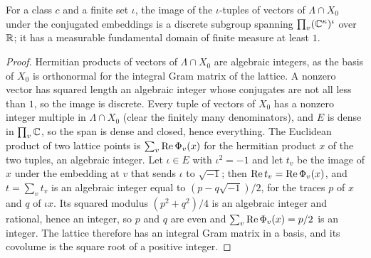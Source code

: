 \begin{lemma}\label{lem:column-lattice}
For a class $c$ and a finite set $\iota$, the image of the $\iota$-tuples of vectors of $\Lambda\cap X_0$ under the conjugated embeddings is a discrete subgroup spanning $\prod_v(\mathbb{C}^\kappa)^\iota$ over $\mathbb{R}$; it has a
measurable fundamental domain of finite measure at least $1$.
\end{lemma}

\begin{proof}
Hermitian products of vectors of $\Lambda\cap X_0$ are algebraic integers, as the basis of $X_0$ is orthonormal for the integral Gram matrix of the lattice. A nonzero vector has squared length an algebraic integer
whose conjugates are not all less than $1$, so the image is discrete. Every tuple of vectors of $X_0$ has a nonzero integer multiple in $\Lambda\cap X_0$ (clear the finitely many denominators), and $E$ is dense in
$\prod_v\mathbb{C}$, so the span is dense and closed, hence everything. The Euclidean product of two lattice points is $\sum_v\operatorname{Re}\Phi_v(x)$ for the hermitian product $x$ of the two tuples, an algebraic integer. Let
$\iota\in E$ with $\iota^2=-1$ and let $t_v$ be the image of $x$ under the embedding at $v$ that sends $\iota$ to $\sqrt{-1}$; then $\operatorname{Re} t_v=\operatorname{Re}\Phi_v(x)$, and $t=\sum_vt_v$ is an algebraic integer equal to $(p-q\sqrt{-1})/2$, for the
traces $p$ of $x$ and $q$ of $\iota x$. Its squared modulus $(p^2+q^2)/4$ is an algebraic integer and rational, hence an integer, so $p$ and $q$ are even and $\sum_v\operatorname{Re}\Phi_v(x)=p/2$ is an integer. The lattice therefore
has an integral Gram matrix in a basis, and its covolume is the square root of a positive integer.
\end{proof}

